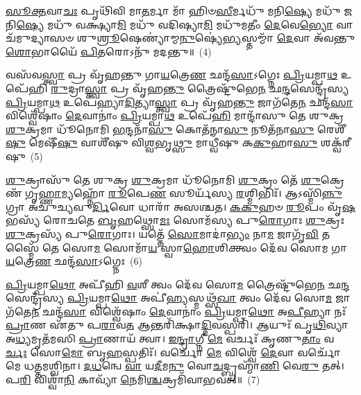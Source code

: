 \-\ul{𑌸𑍂}\-\-\ul{𑌕𑍍𑌤}\-𑌵𑌾\-\ul{𑌚𑌃} 𑌪𑍃𑌥𑌿᳴𑌵𑌿 𑌮𑌾\-\ul{𑌤}\-𑌰𑍍𑌮𑌾 𑌮𑌾᳴ 𑌹𑌿𑍞\-\ul{𑌸𑍀}\-𑌰𑍍𑌮𑌧𑍁᳴ 𑌮𑌨𑌿\-\ul{𑌷𑍍𑌯𑍇} 𑌮𑌧𑍁᳴ 𑌜𑌨𑌿\-\ul{𑌷𑍍𑌯𑍇} 𑌮𑌧𑍁᳴ 𑌵𑌕𑍍𑌷𑍍𑌯𑌾\-\ul{𑌮𑌿} 𑌮𑌧𑍁᳴ 𑌵𑌦𑌿𑌷𑍍𑌯𑌾\-\ul{𑌮𑌿} 𑌮𑌧𑍁᳴𑌮𑌤𑍀𑌂 \ul{𑌦𑍇}\-𑌵𑍇\-\ul{𑌭𑍍𑌯𑍋} 𑌵𑌾𑌚᳴𑌮𑍁𑌦𑍍𑌯𑌾𑌸𑍞 𑌶𑍁\-\ul{𑌶𑍍𑌰𑍂}\-𑌷𑍇𑌣𑍍𑌯𑌾॑𑌮𑍍𑌮\-\ul{𑌨𑍁}\-𑌷𑍍𑌯𑍇॑\-\ul{𑌭𑍍𑌯}\-𑌸𑍍𑌤𑌮𑍍𑌮𑌾᳴ \ul{𑌦𑍇}\-𑌵𑌾 𑌅᳴𑌵𑌨𑍍𑌤𑍁 \ul{𑌶𑍋}\-𑌭𑌾𑌯𑍈᳴ \ul{𑌪𑌿}\-𑌤𑌰𑍋\-𑌽𑌨𑍁᳴ 𑌮𑌦𑌨𑍍𑌤𑍁॥~(4)

{\anuvakamend[{\-\ul{𑌶}\-\-\ul{𑍞}\-\-\ul{𑌸𑌿}\-\-\ul{𑌷}\-𑌦𑍍𑌵𑌿𑌶𑍍𑌵𑍇᳴ \ul{𑌦𑍇}\-𑌵𑌾 \ul{𑌅}\-𑌷𑍍𑌟𑌾𑌵𑌿𑍞᳴𑌶𑌤𑌿𑌶𑍍𑌚}]}%

𑌵𑌸᳴𑌵\-\ul{𑌸𑍍𑌤𑍍𑌵𑌾} 𑌪𑍍𑌰 𑌵𑍃᳴𑌹𑌨𑍍𑌤𑍁 𑌗𑌾\-\ul{𑌯}\-𑌤𑍍𑌰𑍇\-\ul{𑌣} 𑌛𑌨𑍍𑌦᳴\-\ul{𑌸𑌾}\-\-𑌽𑌗𑍍𑌨𑍇𑌃 \ul{𑌪𑍍𑌰𑌿}\-𑌯𑌮𑍍𑌪𑌾\-\ul{𑌥} 𑌉𑌪𑍇᳴𑌹𑌿 \ul{𑌰𑍁}\-𑌦𑍍𑌰𑌾\-\ul{𑌸𑍍𑌤𑍍𑌵𑌾} 𑌪𑍍𑌰 𑌵𑍃᳴𑌹\-\ul{𑌨𑍍𑌤𑍁} 𑌤𑍍𑌰𑍈𑌷𑍍𑌟𑍁᳴𑌭𑍇\-\ul{𑌨} 𑌛\-\ul{𑌨𑍍𑌦}\-𑌸𑍇𑌨𑍍𑌦𑍍𑌰᳴𑌸𑍍𑌯 \ul{𑌪𑍍𑌰𑌿}\-𑌯𑌮𑍍𑌪𑌾\-\ul{𑌥} 𑌉𑌪𑍇॑𑌹𑍍𑌯𑌾\-\ul{𑌦𑌿}\-𑌤𑍍𑌯𑌾\-\ul{𑌸𑍍𑌤𑍍𑌵𑌾} 𑌪𑍍𑌰 𑌵𑍃᳴𑌹\-\ul{𑌨𑍍𑌤𑍁} 𑌜𑌾𑌗᳴𑌤𑍇\-\ul{𑌨} 𑌛𑌨𑍍𑌦᳴\-\ul{𑌸𑌾} 𑌵𑌿𑌶𑍍𑌵𑍇᳴𑌷𑌾𑌂 \ul{𑌦𑍇}\-𑌵𑌾𑌨𑌾𑌂॑ \ul{𑌪𑍍𑌰𑌿}\-𑌯𑌮𑍍𑌪𑌾\-\ul{𑌥} 𑌉𑌪𑍇᳴\-\ul{𑌹𑌿} 𑌮𑌾𑌨𑍍𑌦𑌾᳴𑌸𑍁 𑌤𑍇 𑌶𑍁𑌕𑍍𑌰 \ul{𑌶𑍁}\-𑌕𑍍𑌰𑌮𑌾 𑌧𑍂᳴𑌨𑍋𑌮𑌿 \ul{𑌭}\-𑌨𑍍𑌦𑌨𑌾᳴\-\ul{𑌸𑍁} 𑌕𑍋𑌤᳴𑌨𑌾\-\ul{𑌸𑍁} 𑌨𑍂𑌤᳴𑌨𑌾\-\ul{𑌸𑍁} 𑌰𑍇𑌶𑍀᳴\-\ul{𑌷𑍁} 𑌮𑍇𑌷𑍀᳴\-\ul{𑌷𑍁} 𑌵𑌾𑌶𑍀᳴𑌷𑍁 𑌵𑌿\-\ul{𑌶𑍍𑌵}\-𑌭𑍃\-\ul{𑌥𑍍𑌸𑍁} 𑌮𑌾𑌧𑍍𑌵𑍀᳴𑌷𑍁 𑌕\-\ul{𑌕𑍁}\-𑌹𑌾\-\ul{𑌸𑍁} 𑌶𑌕𑍍𑌵᳴𑌰𑍀𑌷𑍁~(5)

\-\ul{𑌶𑍁}\-𑌕𑍍𑌰𑌾𑌸𑍁᳴ 𑌤𑍇 𑌶𑍁𑌕𑍍𑌰 \ul{𑌶𑍁}\-𑌕𑍍𑌰𑌮𑌾 𑌧𑍂᳴𑌨𑍋𑌮𑌿 \ul{𑌶𑍁}\-𑌕𑍍𑌰𑌂 𑌤𑍇᳴ \ul{𑌶𑍁}\-𑌕𑍍𑌰𑍇𑌣᳴ 𑌗𑍃\-\ul{𑌹𑍍𑌣𑌾}\-𑌮𑍍𑌯𑌹𑍍𑌨𑍋᳴ \ul{𑌰𑍂}\-𑌪𑍇\-\ul{𑌣} 𑌸𑍂𑌰𑍍𑌯᳴𑌸𑍍𑌯 \ul{𑌰}\-𑌶𑍍𑌮𑌿𑌭𑌿𑌃᳴। 𑌆\-𑌽𑌸𑍍𑌮𑌿᳴\-\ul{𑌨𑍍𑌨𑍁}\-𑌗𑍍𑌰𑌾 𑌅᳴𑌚𑍁𑌚𑍍𑌯𑌵𑍁\-\ul{𑌰𑍍𑌦𑌿}\-𑌵𑍋 𑌧𑌾𑌰𑌾᳴ 𑌅𑌸𑌶𑍍𑌚𑌤। \ul{𑌕}\-\-\ul{𑌕𑍁}\-𑌹𑍞 \ul{𑌰𑍂}\-𑌪𑌂 𑌵𑍃᳴\-\ul{𑌷}\-𑌭𑌸𑍍𑌯᳴ 𑌰𑍋𑌚𑌤𑍇 \ul{𑌬𑍃}\-𑌹𑌥𑍍𑌸𑍋\-\ul{𑌮𑌃} 𑌸𑍋𑌮᳴𑌸𑍍𑌯 𑌪𑍁\-\ul{𑌰𑍋}\-𑌗𑌾𑌃 \ul{𑌶𑍁}\-𑌕𑍍𑌰𑌃 \ul{𑌶𑍁}\-𑌕𑍍𑌰𑌸𑍍𑌯᳴ 𑌪𑍁\-\ul{𑌰𑍋}\-𑌗𑌾𑌃। 𑌯𑌤𑍍𑌤𑍇᳴ \ul{𑌸𑍋}\-𑌮𑌾𑌦𑌾॑\-\ul{𑌭𑍍𑌯𑌂} 𑌨𑌾\-\ul{𑌮} 𑌜𑌾𑌗𑍃᳴\-\ul{𑌵𑌿} 𑌤𑌸𑍍𑌮𑍈᳴ 𑌤𑍇 𑌸𑍋\-\ul{𑌮} 𑌸𑍋𑌮𑌾᳴\-\ul{𑌯} 𑌸𑍍𑌵𑌾\-\ul{𑌹𑍋}\-𑌶𑌿𑌕𑍍𑌤𑍍𑌵𑌂 𑌦𑍇᳴𑌵 𑌸𑍋𑌮 𑌗𑌾\-\ul{𑌯}\-𑌤𑍍𑌰𑍇\-\ul{𑌣} 𑌛𑌨𑍍𑌦᳴\-\ul{𑌸𑌾}\-\-𑌽𑌗𑍍𑌨𑍇𑌃~(6)

\-\ul{𑌪𑍍𑌰𑌿}\-𑌯𑌮𑍍𑌪𑌾\-\ul{𑌥𑍋} 𑌅𑌪𑍀᳴𑌹𑌿 \ul{𑌵}\-𑌶𑍀 𑌤𑍍𑌵𑌂 𑌦𑍇᳴𑌵 𑌸𑍋\-\ul{𑌮} 𑌤𑍍𑌰𑍈𑌷𑍍𑌟𑍁᳴𑌭𑍇\-\ul{𑌨} 𑌛\-\ul{𑌨𑍍𑌦}\-𑌸𑍇𑌨𑍍𑌦𑍍𑌰᳴𑌸𑍍𑌯 \ul{𑌪𑍍𑌰𑌿}\-𑌯𑌮𑍍𑌪𑌾\-\ul{𑌥𑍋} 𑌅𑌪𑍀॑\-\ul{𑌹𑍍𑌯}\-𑌸𑍍𑌮𑌥𑍍𑌸᳴\-\ul{𑌖𑌾} 𑌤𑍍𑌵𑌂 𑌦𑍇᳴𑌵 𑌸𑍋\-\ul{𑌮} 𑌜𑌾𑌗᳴𑌤𑍇\-\ul{𑌨} 𑌛𑌨𑍍𑌦᳴\-\ul{𑌸𑌾} 𑌵𑌿𑌶𑍍𑌵𑍇᳴𑌷𑌾𑌂 \ul{𑌦𑍇}\-𑌵𑌾𑌨𑌾𑌂॑ \ul{𑌪𑍍𑌰𑌿}\-𑌯𑌮𑍍𑌪𑌾\-\ul{𑌥𑍋} 𑌅\-\ul{𑌪𑍀}\-𑌹𑍍𑌯𑌾 𑌨𑌃᳴ \ul{𑌪𑍍𑌰𑌾}\-𑌣 𑌏᳴𑌤𑍁 𑌪\-\ul{𑌰𑌾}\-𑌵\-\ul{𑌤} 𑌆𑌨𑍍𑌤𑌰𑌿᳴𑌕𑍍𑌷𑌾\-\ul{𑌦𑍍𑌦𑌿}\-𑌵𑌸𑍍𑌪𑌰𑌿᳴। 𑌆𑌯𑍁𑌃᳴ 𑌪𑍃\-\ul{𑌥𑌿}\-𑌵𑍍𑌯𑌾 𑌅\-\ul{𑌧𑍍𑌯}\-𑌮𑍃𑌤᳴𑌮𑌸𑌿 \ul{𑌪𑍍𑌰𑌾}\-𑌣𑌾𑌯᳴ 𑌤𑍍𑌵𑌾। \ul{𑌇}\-\-\ul{𑌨𑍍𑌦𑍍𑌰𑌾}\-𑌗𑍍𑌨𑍀 \ul{𑌮𑍇} 𑌵𑌰𑍍𑌚𑌃᳴ 𑌕𑍃𑌣𑍁\-\ul{𑌤𑌾𑌂} 𑌵\-\ul{𑌰𑍍𑌚𑌃} 𑌸𑍋\-\ul{𑌮𑍋} 𑌬𑍃\-\ul{𑌹}\-𑌸𑍍𑌪𑌤𑌿𑌃᳴। 𑌵𑌰𑍍𑌚𑍋᳴ \ul{𑌮𑍇} 𑌵𑌿𑌶𑍍𑌵𑍇᳴ \ul{𑌦𑍇}\-𑌵𑌾 𑌵𑌰𑍍𑌚𑍋᳴ 𑌮𑍇 𑌧𑌤𑍍𑌤𑌮𑌶𑍍𑌵𑌿𑌨𑌾। \ul{𑌦}\-\-\ul{𑌧}\-𑌨𑍍𑌵𑍇 \ul{𑌵𑌾} 𑌯\-\ul{𑌦𑍀}\-𑌮\-\ul{𑌨𑍁} 𑌵𑍋\-\ul{𑌚}\-𑌦𑍍𑌬𑍍𑌰𑌹𑍍𑌮𑌾᳴\-\ul{𑌣𑌿} 𑌵𑍇\-\ul{𑌰𑍁} 𑌤𑌤𑍍। 𑌪\-\ul{𑌰𑌿} 𑌵𑌿𑌶𑍍𑌵𑌾᳴\-\ul{𑌨𑌿} 𑌕𑌾𑌵𑍍𑌯𑌾᳴ \ul{𑌨𑍇}\-𑌮𑌿\-\ul{𑌶𑍍𑌚}\-𑌕𑍍𑌰𑌮𑌿᳴𑌵𑌾𑌭𑌵𑌤𑍍॥~(7)

